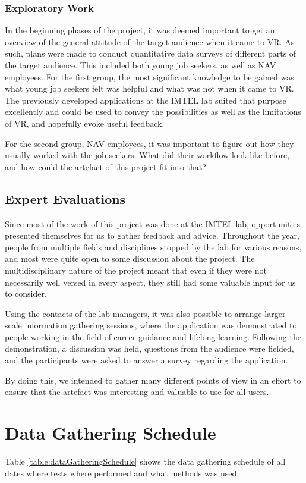 \subsubsection{Exploratory Work}
In the beginning phases of the project, it was deemed important to get an overview of the general attitude of the target audience when it came to VR. As such, plans were made to conduct quantitative data surveys of different parts of the target audience. This included both young job seekers, as well as NAV employees. For the first group, the most significant knowledge to be gained was what young job seekers felt was helpful and what was not when it came to VR. The previously developed applications at the IMTEL lab suited that purpose excellently and could be used to convey the possibilities as well as the limitations of VR, and hopefully evoke useful feedback.

For the second group, NAV employees, it was important to figure out how they usually worked with the job seekers. What did their workflow look like before, and how could the artefact of this project fit into that?


\subsection{Expert Evaluations}
Since most of the work of this project was done at the IMTEL lab, opportunities presented themselves for us to gather feedback and advice. Throughout the year, people from multiple fields and disciplines stopped by the lab for various reasons, and most were quite open to some discussion about the project. The multidisciplinary nature of the project meant that even if they were not necessarily well versed in every aspect, they still had some valuable input for us to consider.

Using the contacts of the lab managers, it was also possible to arrange larger scale information gathering sessions, where the application was demonstrated to people working in the field of career guidance and lifelong learning. Following the demonstration, a discussion was held, questions from the audience were fielded, and the participants were asked to answer a survey regarding the application. 

By doing this, we intended to gather many different points of view in an effort to ensure that the artefact was interesting and valuable to use for all users.

\section{Data Gathering Schedule}
Table \ref{table:dataGatheringSchedule} shows the data gathering schedule of all dates where tests where performed and what methods was used. 
 
